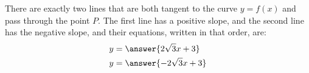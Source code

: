 \documentclass{ximera}
\begin{document}
\begin{exercise}
\begin{image}
\end{image}
There are exactly two lines that  are both tangent to the curve $y=f(x)$ and pass through the point $P$. The first line has a positive slope, and the second line has the negative slope, and their equations, written in that order, are:
\begin{align*}
y &= \answer{2\sqrt{3}x+3}\\ 
y &= \answer{-2\sqrt{3}x+3}\\
\end{align*}
\end{exercise}
\end{document}
